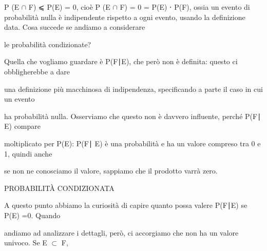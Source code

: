 \documentclass[a4paper,portrait,12pt]{article}
\begin{document}
\begin{flushleft}
P (E $\cap$ F) ⩽ P(E) = 0, cio\`{e} P (E $\cap$ F) = 0 = P(E) ⋅ P(F), ossia un evento di probabilit\`{a} nulla \`{e} indipendente rispetto a ogni evento, usando la definizione data. Cosa succede se andiamo a considerare
\end{flushleft}


\begin{flushleft}
le probabilit\`{a} condizionate?
\end{flushleft}


\begin{flushleft}
Quella che vogliamo guardare \`{e} P(F∣E), che per\`{o} non \`{e} definita: questo ci obbligherebbe a dare
\end{flushleft}


\begin{flushleft}
una definizione più macchinosa di indipendenza, specificando a parte il caso in cui un evento
\end{flushleft}


\begin{flushleft}
ha probabilit\`{a} nulla. Osserviamo che questo non \`{e} davvero influente, perch\'{e} P(F∣ E) compare
\end{flushleft}


\begin{flushleft}
moltiplicato per P(E): P(F∣ E) \`{e} una probabilit\`{a} e ha un valore compreso tra 0 e 1, quindi anche
\end{flushleft}


\begin{flushleft}
se non ne conosciamo il valore, sappiamo che il prodotto varr\`{a} zero.
\end{flushleft}










\begin{flushleft}
PROBABILIT\`{A} CONDIZIONATA
\end{flushleft}





\begin{flushleft}
A questo punto abbiamo la curiosit\`{a} di capire quanto possa valere P(F∣E) se P(E) =0. Quando
\end{flushleft}


\begin{flushleft}
andiamo ad analizzare i dettagli, per\`{o}, ci accorgiamo che non ha un valore univoco. Se E $\subset$ F,
\end{flushleft}
\end{document}
